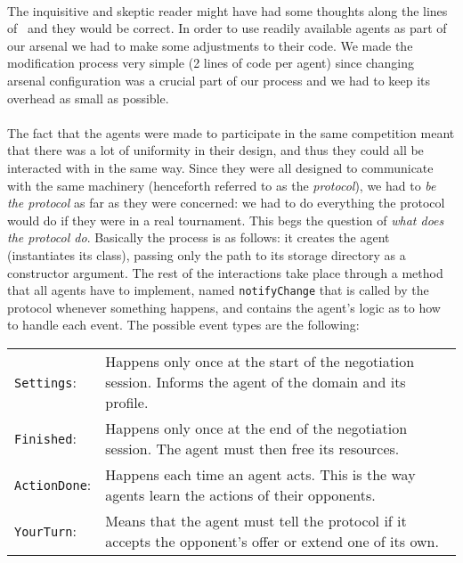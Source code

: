 \paragraph*{}
The inquisitive and skeptic reader might have had some thoughts along the lines of  \textendash \ and they would be correct. In order to use readily available agents as part of our arsenal we had to make some adjustments to their code. We made the modification process very simple (2 lines of code per agent) since changing arsenal configuration was a crucial part of our process and we had to keep its overhead as small as possible.

\paragraph*{}
The fact that the agents were made to participate in the same competition meant that there was a lot of uniformity in their design, and thus they could all be interacted with in the same way. Since they were all designed to communicate with the same machinery (henceforth referred to as the \emph{protocol}), we had to \emph{be the protocol} as far as they were concerned: we had to do everything the protocol would do if they were in a real tournament. %
This begs the question of \emph{what does the protocol do}. Basically the process is as follows: it creates the agent (instantiates its class), passing only the path to its storage directory as a constructor argument. The rest of the interactions take place through a method that all agents have to implement, named \texttt{notifyChange} that is called by the protocol whenever something happens, and contains the agent's logic as to how to handle each event. The possible event types are the following:
\renewcommand{\arraystretch}{1.5} %
\begin{longtable}{l p{290pt}}

    \texttt{Settings}: & Happens only once at the start of the negotiation session. Informs the agent of the domain and its profile. \\

    \texttt{Finished}: & Happens only once at the end of the negotiation session. The agent must then free its resources. \\
    
    \texttt{ActionDone}: & Happens each time an agent acts. This is the way agents learn the actions of their opponents. \\
    
    \texttt{YourTurn}:	& Means that the agent must tell the protocol if it accepts the opponent's offer or extend one of its own. \\

\end{longtable}

